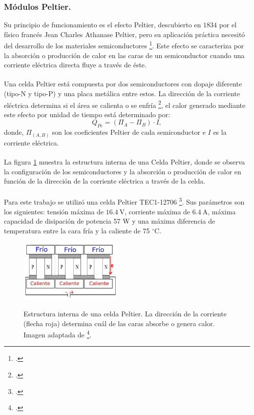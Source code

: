 \subsubsection{Módulos Peltier.}
Su principio de funcionamiento es el efecto Peltier, descubierto en $1834$ por el físico francés Jean Charles Athanase Peltier, pero su aplicación práctica necesitó del desarrollo de los materiales semiconductores \footcite{Sandoval2007}. Este efecto se caracteriza por la absorción o producción de calor en las caras de un semiconductor cuando una corriente eléctrica directa fluye a través de éste. \\ \\
Una celda Peltier está compuesta por  dos semiconductores con dopaje diferente (tipo-N y tipo-P) y una placa metálica entre estos. La dirección de la corriente eléctrica determina si el área se calienta o se enfría \footcite{peltier_theory}, el calor generado mediante este efecto por unidad de tiempo está determinado por:
\begin{equation}
Q_{Pe}=(\Pi_{A}-\Pi_{B})\cdot I,
\label{peltier_eq}
\end{equation}
donde, $\Pi_{(A,B)}$ son los coeficientes Peltier de cada semiconductor e $I$ es la corriente eléctrica.\\ \\
La figura \ref{fig:celda} muestra la estructura interna de una Celda Peltier, donde se observa la configuración de los semiconductores y la absorción o producción de calor en función de la dirección de la corriente eléctrica a través de la celda.\\ \\
Para este trabajo se utilizó una celda Peltier TEC1-12706 \footcite{datasheet_Peltier}. Sus parámetros son los siguientes: tensión máxima de $16.4~\mbox{V}$, corriente máxima de $6.4~\mbox{A}$, máxima capacidad de disipación de potencia 57 W y una máxima diferencia de temperatura entre la cara fría y la caliente de 75 $^\circ \mbox{C}$.

\begin{figure}[h!]
\begin{centering}
    \caption{Estructura interna de una celda Peltier. La dirección de la corriente (flecha roja) determina cuál de las caras absorbe o genera calor. Imagen adaptada de \footcite{tesis_caract_SIPM}.}
    \includegraphics[width=0.45\textwidth]{Images/celda.JPG}
    \label{fig:celda}
  \par\end{centering}
\end{figure}

